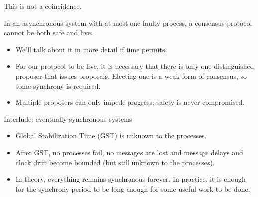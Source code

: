 \documentclass{beamer}
\begin{document}
\begin{frame}{This is not a coincidence.}
  \begin{theorem}
    In an asynchronous system with \alert{at most one} faulty process, a consensus protocol cannot be both safe and live.
  \end{theorem}
  \begin{itemize}
    \item We'll talk about it in more detail if time permits.
    \item For our protocol to be live, it is necessary that there is only one \alert{distinguished proposer} that issues proposals. Electing one is a weak form of consensus, so some synchrony is required.
    \item Multiple proposers can only impede progress; \alert{safety is never compromised}.
  \end{itemize}
\end{frame}

\begin{frame}{Interlude: eventually synchronous systems}
  \begin{figure}[!h]
  \centering
  \end{figure}
  \begin{itemize}
    \item Global Stabilization Time (GST) is unknown to the processes.
    \item After GST, no processes fail, no messages are lost and message delays and clock drift become bounded (but still unknown to the processes).
    \item In theory, everything remains synchronous forever. In practice, it is enough for the synchrony period to be long enough for some useful work to be done.
  \end{itemize}
\end{frame}
\end{document}
